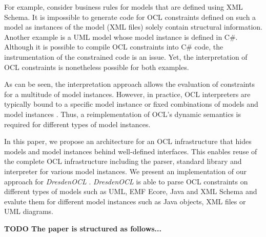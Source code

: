 	For example, consider business rules for models that are defined using XML Schema. 
	It is impossible to generate code for OCL constraints defined on such 
	a model as instances of the model (XML files) solely contain structural information. 
	Another example is a UML model whose model
	instance is defined in C\#. Although it is possible to compile OCL constraints into 
	C\# code, the instrumentation of the constrained code is an issue. Yet, the interpretation 
	of OCL constraints is nonetheless possible for both examples.

	As can be seen, the interpretation approach allows the evaluation of 
	constraints for a multitude of model instances. However, in practice, OCL 
	interpreters are typically bound 
	to a specific model instance or fixed combinations of models and model instances 
	. Thus, a reimplementation of OCL's dynamic semantics 
	is required for different types of model instances.

	In this paper, we propose an architecture for an OCL
	infrastructure that hides models and model instances behind well-defined interfaces.
	This enables reuse of the complete OCL infrastructure including the parser, 
	standard library and interpreter for various model instances. We present an
	implementation of our approach for \textit{DresdenOCL}
	\cite{WWW:dresdenOCL}. \textit{DresdenOCL} is able to parse OCL
	constraints on different types of models such as UML, EMF Ecore, Java and 
	XML Schema and evalute them for different model instances such as Java 
	objects, XML files or {UML diagrams}.
	
	\textbf{TODO The paper is structured as follows...}